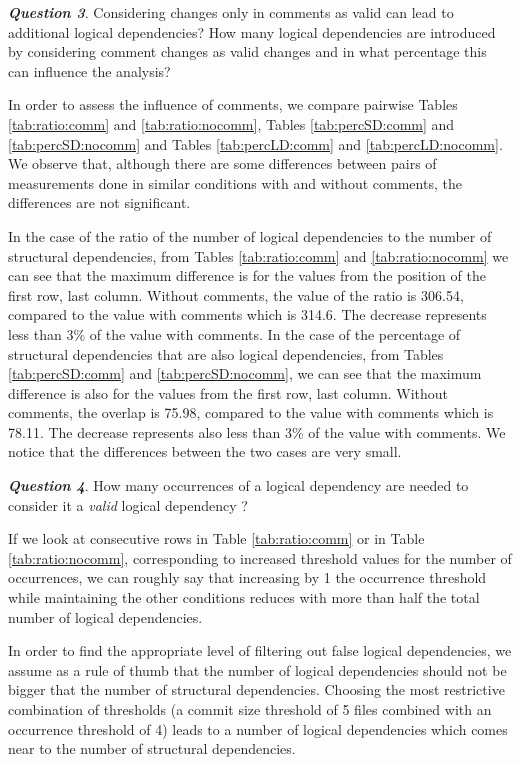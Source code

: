 \documentclass[a4paper,twoside]{article}
\begin{document}
\textit{\textbf{Question 3}}. Considering changes only in comments as valid can lead to additional logical dependencies? How many logical dependencies are introduced by considering comment changes as valid changes and in what percentage this can influence the analysis?

In order to assess the influence of comments, we compare pairwise Tables \ref{tab:ratio:comm} and \ref{tab:ratio:nocomm},  
Tables \ref{tab:percSD:comm} and \ref{tab:percSD:nocomm} and Tables \ref{tab:percLD:comm} and \ref{tab:percLD:nocomm}. 
We observe that, although there are some differences between pairs of measurements done in similar conditions with and without comments, the differences are not significant.

In the case of the ratio of the number of logical dependencies to the number of structural dependencies, from Tables \ref{tab:ratio:comm} and \ref{tab:ratio:nocomm} we can see that the maximum difference is for the values from the position of the first row, last column. Without comments, the value of the ratio is 306.54, compared to the value with comments which is 314.6. The decrease represents less than 3\% of the value with comments. In the case of the percentage of structural dependencies that are also logical dependencies, from Tables \ref{tab:percSD:comm} and \ref{tab:percSD:nocomm}, we can see that the maximum difference is also for the values from the first row, last column. Without comments, the overlap is 75.98, compared to the value with comments which is 78.11.  The decrease represents also less than 3\% of the value with comments. We notice that the differences between the two cases are very small. %



\textit{\textbf{Question 4}}. How many occurrences of a logical dependency are needed to consider it a \textit{valid} logical dependency ? 

If we look at consecutive rows in Table \ref{tab:ratio:comm} or in Table \ref{tab:ratio:nocomm}, corresponding to increased threshold values for the number of occurrences, we can roughly say that  increasing by 1 the occurrence threshold while maintaining the other conditions reduces with more than half the total number of logical dependencies.  

In order to find the appropriate level of filtering out false logical dependencies, we assume as a rule of thumb that the number of logical dependencies should not be bigger that the number of structural dependencies. Choosing the most restrictive combination of thresholds (a commit size threshold of 5 files combined with an occurrence threshold of 4) leads to a number of logical dependencies which comes near to the number of structural dependencies.
\end{document}
